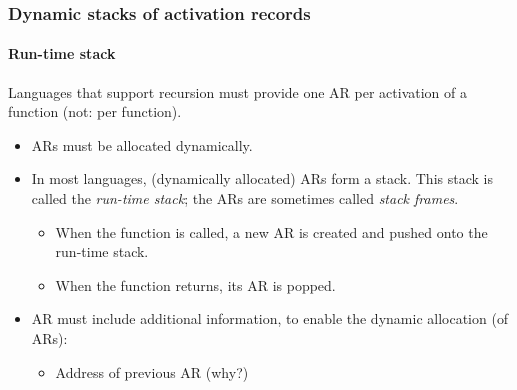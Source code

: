 \documentclass{beamer}
\begin{document}
\begin{frame}[fragile]
\frametitle{Dynamic stacks of activation records}
\framesubtitle{Run-time stack}
Languages that support recursion must provide one AR per
activation of a function (not: per function).

\begin{itemize}
\item ARs must be allocated dynamically.
\item In most languages, (dynamically allocated) ARs form
a stack. This stack is called the \textit{run-time stack};
the ARs are sometimes called \textit{stack frames}. 
\begin{itemize}
\item When the function is called, a new AR is created and
pushed onto the run-time stack. 
\item When the function returns, its AR is popped.
\end{itemize}
\item AR must include additional information, to enable the dynamic
allocation (of ARs): 
\begin{itemize}
\item Address of previous AR (why?)
\end{itemize}
\end{itemize}
\end{frame}
\end{document}
